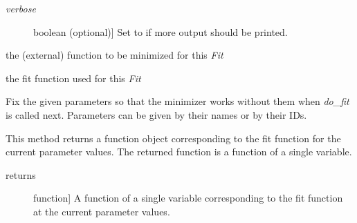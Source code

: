 \documentclass[a4paper,10pt,english]{sphinxmanual}
\begin{document}
\begin{fulllineitems}
\begin{fulllineitems}
\begin{description}
\item[{\emph{verbose}}] \leavevmode{[}boolean (optional){]}
Set to  if more output should be printed.

\end{description}

\end{fulllineitems}


\begin{fulllineitems}
\label{index:kafe.fit.Fit.external_fcn}
the (external) function to be minimized for this \emph{Fit}

\end{fulllineitems}


\begin{fulllineitems}
\label{index:kafe.fit.Fit.fit_function}
the fit function used for this \emph{Fit}

\end{fulllineitems}


\begin{fulllineitems}
\label{index:kafe.fit.Fit.fix_parameters}
Fix the given parameters so that the minimizer works without them
when \emph{do\_fit} is called next. Parameters can be given by their names
or by their IDs.

\end{fulllineitems}


\begin{fulllineitems}
\label{index:kafe.fit.Fit.get_current_fit_function}
This method returns a function object corresponding to the fit function
for the current parameter values. The returned function is a function
of a single variable.
\begin{description}
\item[{returns}] \leavevmode{[}function{]}
A function of a single variable corresponding to the fit function
at the current parameter values.


\end{description}
\end{fulllineitems}
\end{fulllineitems}
\end{document}
